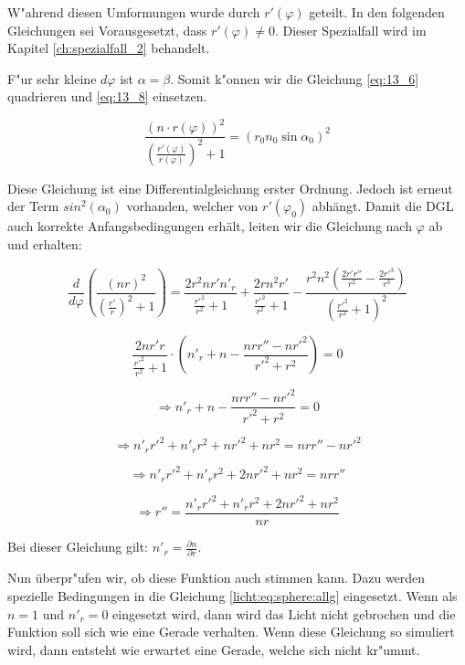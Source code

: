 W"ahrend diesen Umformungen wurde durch $r'(\varphi)$ geteilt. 
In den folgenden Gleichungen sei Vorausgesetzt, dass $r'(\varphi) \neq 0$. 
Dieser Spezialfall wird im Kapitel \ref{ch:spezialfall_2} behandelt. 

F"ur sehr kleine $d\varphi$ ist $\alpha = \beta$. 
Somit k"onnen wir die Gleichung \ref{eq:13_6} quadrieren und \ref{eq:13_8} einsetzen.

$$\frac{(n \cdot r(\varphi))^2}{\left( \frac{r'(\varphi)}{r(\varphi)} \right)^2 +1} = (r_0 n_0 \sin \alpha_0)^2$$

Diese Gleichung ist eine Differentialgleichung erster Ordnung. 
Jedoch ist erneut der Term $sin^2(\alpha_0)$ vorhanden, welcher von $r'(\varphi_0)$ abhängt. 
Damit die DGL auch korrekte Anfangsbedingungen erhält, leiten wir die Gleichung nach $\varphi$ ab und erhalten:

$$\frac{d}{d\varphi}\left(\frac{(n r)^2}{\left(\frac{r'}{r}\right)^2 + 1}\right) =  \frac{2 r^2 n r' n'_r}{\frac{r'^2}{r^2}+1}+\frac{2 r n^2 r'}{\frac{r'^2}{r^2}+1}-\frac{r^2 n^2 \left(\frac{2 r' r''}{r^2}-\frac{2 r'^3}{r^3}\right)}{\left(\frac{r'^2}{r^2}+1\right)^2}$$

$$\frac{2n r' r}{\frac{r'^2}{r^2}+1} \cdot \left( n'_r + n - \frac{n r r'' - n r'^2}{r'^2 + r^2} \right) = 0$$

$$\Rightarrow n'_r + n - \frac{n r r'' - n r'^2}{r'^2 + r^2} = 0$$

$$\Rightarrow n'_r r'^2  + n'_r r^2 + n r'^2 + nr^2 = n r r'' - n r'^2$$

$$\Rightarrow n'_r r'^2 + n'_r r^2 + 2 n r'^2 + n r^2 = n r r''$$

\begin{equation} \label{licht:eq:sphere:allg}
\Rightarrow r'' = \frac{n'_r r'^2 + n'_r r^2 + 2 n r'^2 + n r^2}{n r}
\end{equation}

Bei dieser Gleichung gilt: $n'_r = \frac{\partial n}{\partial r}$. 

Nun überpr"ufen wir, ob diese Funktion auch stimmen kann. 
Dazu werden spezielle Bedingungen in die Gleichung \ref{licht:eq:sphere:allg} eingesetzt. 
Wenn als $n = 1$ und $n'_r = 0$ eingesetzt wird, dann wird das Licht nicht gebrochen und die Funktion soll sich wie eine Gerade verhalten. 
Wenn diese Gleichung so simuliert wird, dann entsteht wie erwartet eine Gerade, welche sich nicht kr"ummt. 



